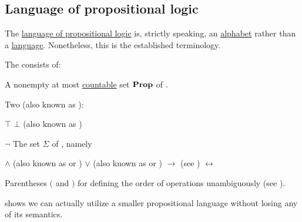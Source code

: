 \subsection{Language of propositional logic}\label{subsec:propositional_logic}

\begin{remark}\label{rem:propositional_language_is_alphabet}
  The \hyperref[def:propositional_language]{language of propositional logic} is, strictly speaking, an \hyperref[def:language/alphabet]{alphabet} rather than a \hyperref[def:language/language]{language}. Nonetheless, this is the established terminology.
\end{remark}

\begin{definition}\label{def:propositional_language}\mcite\cite[102]{OpenLogic20201202}
  The  consists of:

  \begin{thmenum}
     A nonempty at most \hyperref[rem:cardinals/countable]{countable} set \( \operatorname{\mathbf{Prop}} \) of .

     Two  (also known as ):
    \begin{thmenum}
        \( \top \)
        \( \bot \) (also known as )
    \end{thmenum}

      \( \neg \)
     The set \( \Sigma \) of , namely
    \begin{thmenum}
        \( \wedge \) (also known as \hyperref[def:standard_boolean_operators]{} or \hyperref[def:lattice_operations]{})
        \( \vee \) (also known as \hyperref[def:standard_boolean_operators]{} or \hyperref[def:lattice_operations]{})
        \( \to \) (see )
        \( \leftrightarrow \)
    \end{thmenum}

     Parentheses \( ( \) and \( ) \) for defining the order of operations unambiguously (see ).
  \end{thmenum}

   shows we can actually utilize a smaller propositional language without losing any of its semantics.
\end{definition}

